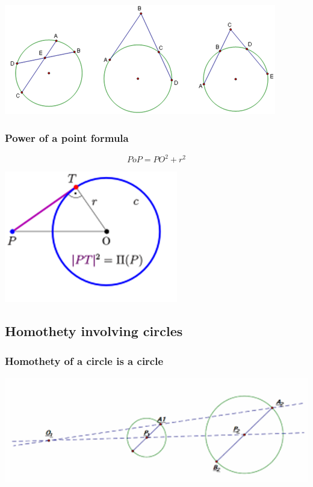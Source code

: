\documentclass{article}
\begin{document}
\includegraphics[scale=1.2]{Picture13.png}

\pagebreak

\subsubsection{Power of a point formula}

\[PoP = {PO}^2+r^2\]

\begin{center}
\includegraphics{Picture14.png}
\end{center}

\vspace{60px}

\subsection{Homothety involving circles}

\subsubsection{Homothety of a circle is a circle}

\includegraphics{Picture15.png}
\end{document}
